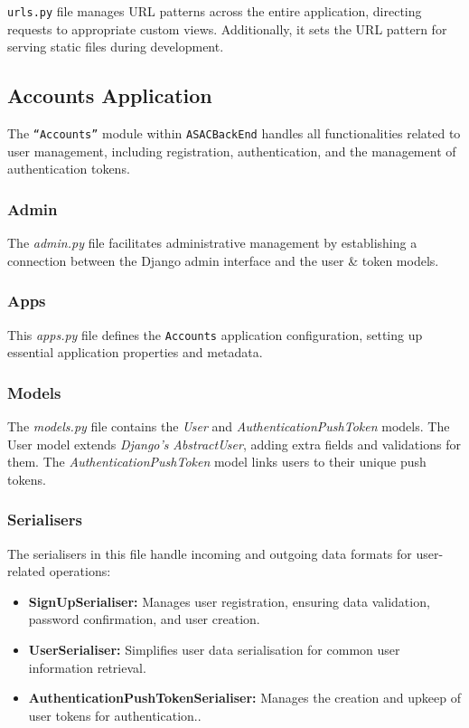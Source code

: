 \texttt{urls.py} file manages URL patterns across the entire application, directing requests to appropriate custom views. Additionally, it sets the URL pattern for serving static files during development.

\subsection{Accounts Application}

The \texttt{``Accounts''} module within \texttt{ASACBackEnd} handles all functionalities related to user management, including registration, authentication, and the management of authentication tokens.

\subsubsection{Admin} 

The \textit{admin.py} file facilitates administrative management by establishing a connection between the Django admin interface and the user \& token models.

\subsubsection{Apps} 

This \textit{apps.py} file defines the \texttt{Accounts} application configuration, setting up essential application properties and metadata.

\subsubsection{Models} 

The \textit{models.py} file contains the \textit{User} and \textit{AuthenticationPushToken} models. The User model extends \textit{Django's} \textit{AbstractUser}, adding extra fields and validations for them. The \textit{AuthenticationPushToken} model links users to their unique push tokens.

\subsubsection{Serialisers}

The serialisers in this file handle incoming and outgoing data formats for user-related operations:

\begin{itemize}
    \item \textbf{SignUpSerialiser:} Manages user registration, ensuring data validation, password confirmation, and user creation.
    \item \textbf{UserSerialiser:} Simplifies user data serialisation for common user information retrieval.
    \item \textbf{AuthenticationPushTokenSerialiser:} Manages the creation and upkeep of user tokens for authentication..
\end{itemize}

